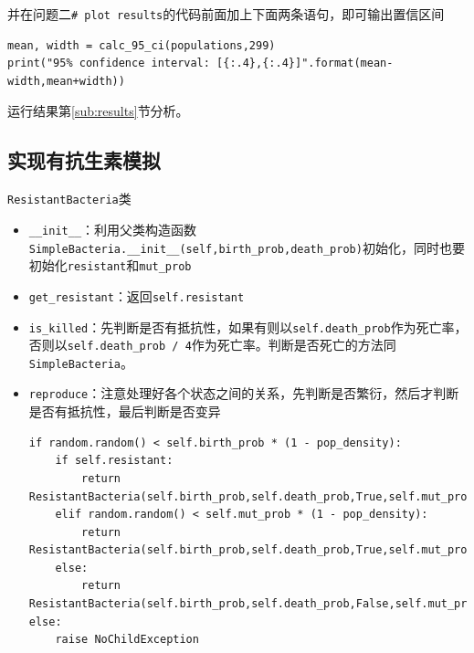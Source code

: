 \documentclass[logo,reportComp]{thesis}
\begin{document}
并在问题二\verb'# plot results'的代码前面加上下面两条语句，即可输出置信区间
\begin{lstlisting}
mean, width = calc_95_ci(populations,299)
print("95% confidence interval: [{:.4},{:.4}]".format(mean-width,mean+width))
\end{lstlisting}

运行结果第\ref{sub:results}节分析。

\subsection{实现有抗生素模拟}
\verb'ResistantBacteria'类
\begin{itemize}
	\item \verb'__init__'：利用父类构造函数\verb'SimpleBacteria.__init__(self,birth_prob,death_prob)'初始化，同时也要初始化\verb'resistant'和\verb'mut_prob'
	\item \verb'get_resistant'：返回\verb'self.resistant'
	\item \verb'is_killed'：先判断是否有抵抗性，如果有则以\verb'self.death_prob'作为死亡率，否则以\verb'self.death_prob / 4'作为死亡率。判断是否死亡的方法同\verb'SimpleBacteria'。
	\item \verb'reproduce'：注意处理好各个状态之间的关系，先判断是否繁衍，然后才判断是否有抵抗性，最后判断是否变异
\begin{lstlisting}
if random.random() < self.birth_prob * (1 - pop_density):
    if self.resistant:
        return ResistantBacteria(self.birth_prob,self.death_prob,True,self.mut_prob)
    elif random.random() < self.mut_prob * (1 - pop_density):
        return ResistantBacteria(self.birth_prob,self.death_prob,True,self.mut_prob)
    else:
        return ResistantBacteria(self.birth_prob,self.death_prob,False,self.mut_prob)
else:
    raise NoChildException
\end{lstlisting}
\end{itemize}
\end{document}
